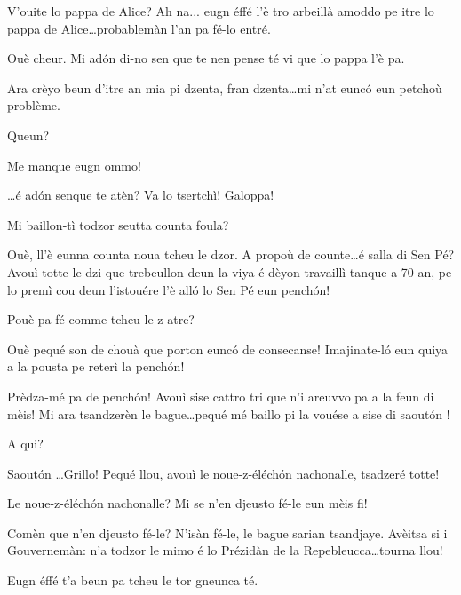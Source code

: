 \begin{drama}
\Guillaumespeaks{} V'ouite lo pappa de Alice? Ah na... eugn éffé l'è tro arbeillà amoddo pe itre lo pappa de Alice\ldots probablemàn l'an pa fé-lo entré.

\Cheriespeaks Ouè cheur.  Mi ad\'on di-no sen que te nen pense té vi que lo pappa l'è pa.

\Alicespeaks Ara crèyo beun d'itre an mia pi dzenta, fran dzenta\ldots mi n'at eunc\'o eun petchoù problème.

\Cheriespeaks Queun?

\Alicespeaks Me manque eugn ommo!

\Cheriespeaks \ldots é ad\'on senque te atèn? Va lo tsertchì! Galoppa!




  
\Vioujspeaks Mi baillon-tì todzor seutta counta foula?

\Vioupspeaks Ouè, ll'è eunna counta noua tcheu le dzor. A propoù de counte\ldots é salla di Sen Pé? Avouì totte le dzi que trebeullon deun la viya é dèyon travaillì tanque a 70 an, pe lo premì cou deun l'istouére l'è all\'o lo Sen Pé eun pench\'on!

\Vioujspeaks Pouè pa fé comme tcheu le-z-atre?

\Vioupspeaks Ouè pequé son de chouà que porton eunc\'o de consecanse! I\-ma\-ji\-na\-te-l\'o eun quiya a la pousta pe reterì la pench\'on! 

\Vioujspeaks Prèdza-mé pa de pench\'on! Avouì sise cattro tri que n'i areuvvo pa a la feun di mèis! Mi ara tsandzerèn le bague\ldots pequé mé baillo pi la vouése a sise di saout\'on !

\Vioupspeaks A qui?

\Vioujspeaks Saout\'on \ldots Grillo! Pequé llou, avouì le noue-z-éléch\'on nachonalle, tsadzeré totte!

\Vioupspeaks Le noue-z-éléch\'on nachonalle? Mi se n'en djeusto fé-le eun mèis fi!

\Vioujspeaks Comèn que n'en djeusto fé-le? N'isàn fé-le, le bague sarian tsandjaye. Avèitsa si i Gouvernemàn: n'a todzor le mimo é lo Prézidàn de la Repebleucca\ldots tourna llou!

\Vioupspeaks Eugn éffé t'a beun pa tcheu le tor gneunca té.


\end{drama}

